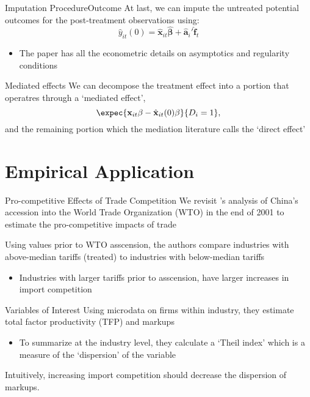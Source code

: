 \documentclass[aspectratio=169,t,11pt,table]{beamer}
\def\*#1{\mathbf{#1}}
\begin{document}
\begin{frame}{Imputation Procedure}{Outcome}
  At last, we can impute the untreated potential outcomes for the post-treatment observations using:
  $$
    \hat{y}_{it}(0) = \hat{\*x}_{it}\hat{\*\beta} + \hat{\*a}_i' \hat{\*f}_t
  $$

  \bigskip
  \begin{itemize}
    \item The paper has all the econometric details on asymptotics and regularity conditions
  \end{itemize}
\end{frame}

\begin{frame}{Mediated effects}
  We can decompose the treatment effect into a portion that operatres through a `mediated effect',
  $$
    \expec{\*x_{it}\beta - \hat{\*x}_{it}(0)\beta}{D_i = 1},
  $$
  and the remaining portion which the mediation literature calls the `direct effect'
\end{frame}


\section{Empirical Application}

\begin{frame}{Pro-competitive Effects of Trade Competition}
  We revisit \citet{lu2015trade}'s analysis of China's accession into the World Trade Organization (WTO) in the end of 2001 to estimate the pro-competitive impacts of trade

  \bigskip
  Using values prior to WTO asscension, the authors compare industries with above-median tariffs (treated) to industries with below-median tariffs 
  \begin{itemize}
    \item Industries with larger tariffs prior to asscension, have larger increases in import competition
  \end{itemize}
\end{frame}

\begin{frame}{Variables of Interest}
  Using microdata on firms within industry, they estimate total factor productivity (TFP) and markups
  \begin{itemize}
    \item To summarize at the industry level, they calculate a `Theil index' which is a measure of the `dispersion' of the variable
  \end{itemize}

  \bigskip
  Intuitively, increasing import competition should decrease the dispersion of markups.
\end{frame}
\end{document}
